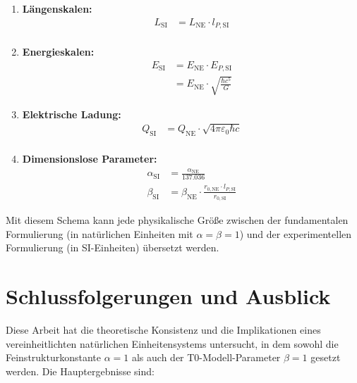 \documentclass[12pt,a4paper]{article}
\begin{document}
	\begin{tcolorbox}[colback=blue!5!white,colframe=blue!75!black,title=Umrechnungsschema für natürliche und SI-Einheiten]
		\begin{enumerate}
			\item \textbf{Längenskalen:}
			\begin{align}
				L_{\text{SI}} &= L_{\text{NE}} \cdot l_{P,\text{SI}}\\
			\end{align}
			
			\item \textbf{Energieskalen:}
			\begin{align}
				E_{\text{SI}} &= E_{\text{NE}} \cdot E_{P,\text{SI}}\\
				&= E_{\text{NE}} \cdot \sqrt{\frac{\hbar c^5}{G}}
			\end{align}
			
			\item \textbf{Elektrische Ladung:}
			\begin{align}
				Q_{\text{SI}} &= Q_{\text{NE}} \cdot \sqrt{4\pi\varepsilon_0 \hbar c}\\
			\end{align}
			
			\item \textbf{Dimensionslose Parameter:}
			\begin{align}
				\alpha_{\text{SI}} &= \frac{\alpha_{\text{NE}}}{137.036}\\
				\beta_{\text{SI}} &= \beta_{\text{NE}} \cdot \frac{r_{0,\text{NE}} \cdot l_{P,\text{SI}}}{r_{0,\text{SI}}}
			\end{align}
		\end{enumerate}
	\end{tcolorbox}
	
	Mit diesem Schema kann jede physikalische Größe zwischen der fundamentalen Formulierung (in natürlichen Einheiten mit $\alpha = \beta = 1$) und der experimentellen Formulierung (in SI-Einheiten) übersetzt werden.
	
	\section{Schlussfolgerungen und Ausblick}
	
	Diese Arbeit hat die theoretische Konsistenz und die Implikationen eines vereinheitlichten natürlichen Einheitensystems untersucht, in dem sowohl die Feinstrukturkonstante $\alpha = 1$ als auch der T0-Modell-Parameter $\beta = 1$ gesetzt werden. Die Hauptergebnisse sind:
	
\end{document}
